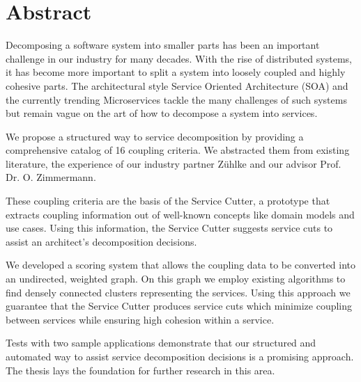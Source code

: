\chapter{Abstract}

Decomposing a software system into smaller parts has been an important challenge in our industry for many decades. With the rise of distributed systems, it has become more important to split a system into loosely coupled and highly cohesive parts. The architectural style Service Oriented Architecture (SOA) and the currently trending Microservices tackle the many challenges of such systems but remain vague on the art of how to decompose a system into services.

We propose a structured way to service decomposition by providing a comprehensive catalog of 16 coupling criteria. We abstracted them from existing literature, the experience of our industry partner Zühlke and our advisor Prof. Dr. O. Zimmermann.

These coupling criteria are the basis of the Service Cutter, a prototype that extracts coupling information out of well-known concepts like domain models and use cases. Using this information, the Service Cutter suggests service cuts to assist an architect’s decomposition decisions. 

We developed a scoring system that allows the coupling data to be converted into an undirected, weighted graph. On this graph we employ existing algorithms to find densely connected clusters representing the services. Using this approach we guarantee that the Service Cutter produces service cuts which minimize coupling between services while ensuring high cohesion within a service. 

Tests with two sample applications demonstrate that our structured and automated way to assist service decomposition decisions is a promising approach. The thesis lays the foundation for further research in this area.